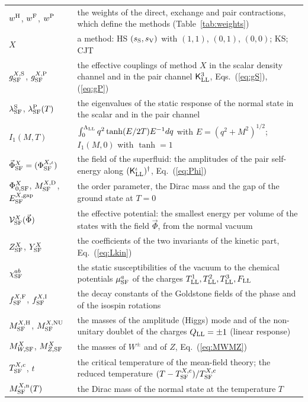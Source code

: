 \documentclass[aps,prd,onecolumn,superscriptaddress,nofootinbib,floatfix,longbibliography]{revtex4-2}
\newcommand{\LL}{{\rm LL}}
\newcommand{\SF}{{\rm SF}}
\begin{document}
\begin{longtable}{p{}p{}}
$w^{\rm H}$, $w^{\rm F}$, $w^{\rm P}$ & the weights of the direct, exchange and pair contractions, which define the methods (Table~\ref{tab:weights}) \\
$X$ & a method: HS $(s_{\rm S},s_{\rm V})$ with $(1,1)$, $(0,1)$, $(0,0)$; KS; CJT \\
$g^{X,{\rm S}}_\SF$, $g^{X,{\rm P}}_\SF$ & the effective couplings of method $X$ in the scalar density channel and in the pair channel $\mathsf K^3_\LL$, Eqs.~(\ref{eq:gS}), (\ref{eq:gP}) \\
$\lambda^{\rm S}_\SF$, $\lambda^{\rm P}_\SF(T)$ & the eigenvalues of the static response of the normal state in the scalar and in the pair channel \\
$I_1(M,T)$ & $\int_0^{\Lambda_\LL}q^2\tanh(E/2T)E^{-1}dq$ with $E=(q^2+M^2)^{1/2}$; $I_1(M,0)$ with $\tanh=1$ \\
$\vec\Phi^X_\SF=(\Phi^{X,\iota}_\SF)$ & the field of the superfluid: the amplitudes of the pair self-energy along $(\mathsf K^\iota_\LL)^\dagger$, Eq.~(\ref{eq:Phi}) \\
$\Phi^X_{0,\SF}$, $M^{X,{\rm D}}_\SF$, $E^{X,{\rm gap}}_\SF$ & the order parameter, the Dirac mass and the gap of the ground state at $T=0$ \\
$\mathcal V^X_\SF(\vec\Phi)$ & the effective potential: the smallest energy per volume of the states with the field $\vec\Phi$, from the normal vacuum \\
$Z^X_\SF$, $Y^X_\SF$ & the coefficients of the two invariants of the kinetic part, Eq.~(\ref{eq:Lkin}) \\
$\chi^{ab}_\SF$ & the static susceptibilities of the vacuum to the chemical potentials $\mu^a_\SF$ of the charges $T^1_\LL,T^2_\LL,T^3_\LL,F_\LL$ \\
$f^{X,{\rm F}}_\SF$, $f^{X,{\rm I}}_\SF$ & the decay constants of the Goldstone fields of the phase and of the isospin rotations \\
$M^{X,{\rm H}}_\SF$, $M^{X,{\rm NU}}_\SF$ & the masses of the amplitude (Higgs) mode and of the non-unitary doublet of the charges $Q_\LL=\pm1$ (linear response) \\
$M^X_{W,\SF}$, $M^X_{Z,\SF}$ & the masses of $W^\pm$ and of $Z$, Eq.~(\ref{eq:MWMZ}) \\
$T^{X,{\rm c}}_\SF$, $t$ & the critical temperature of the mean-field theory; the reduced temperature $(T-T^{X,{\rm c}}_\SF)/T^{X,{\rm c}}_\SF$ \\
$M^{X,{\rm n}}_\SF(T)$ & the Dirac mass of the normal state at the temperature $T$ \\

\end{longtable}
\end{document}
